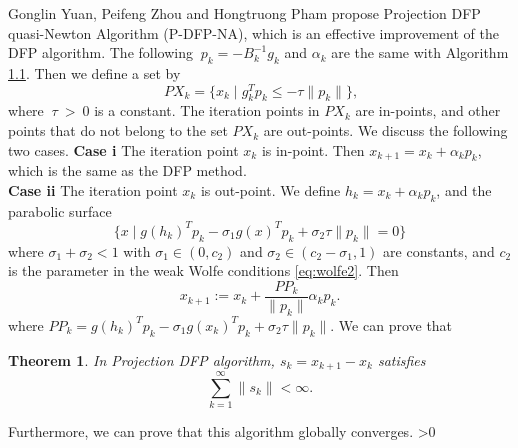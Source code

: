 \documentclass[12pt,a4paper]{article}  %
\newcounter{cite}
\newtheorem{theorem}{Theorem}[section]
\theoremstyle{definition}
\numberwithin{equation}{section}
\begin{document}
Gonglin Yuan, Peifeng Zhou and Hongtruong Pham\cite{yuan2026projection} propose Projection DFP quasi-Newton Algorithm (P-DFP-NA), which is an effective improvement of the DFP algorithm. The following $~p_k=-B_k^{-1}g_k$ and $\alpha_k$ are the same with Algorithm \hyperref[1.1]{1.1}. Then we define a set by \begin{equation}
	~PX_k = \{x_k \mid g_k^T p_k \leq -\tau \|p_k\|\},
\end{equation} where $~\tau ~> ~0$ is a constant. The iteration points in $PX_k$ are in-points, and other points that do not belong to the set $PX_k$ are out-points. We discuss the following two cases.
\textbf{Case i} The iteration point $x_k$ is in-point. Then $x_{k+1}=x_k+\alpha_k p_k$, which is the same as the DFP method.\\
\textbf{\normalsize Case ii} The iteration point $x_k$ is out-point. We define $h_k=x_k+\alpha_kp_k$, and the parabolic surface \begin{equation}
	\{x \mid g(h_k)^T p_k - \sigma_1 g(x)^T p_k + \sigma_2 \tau \|p_k\| = 0\}
\end{equation}
where \( \sigma_1 + \sigma_2 < 1 \) with \( \sigma_1 \in (0, c_2) \) and \( \sigma_2 \in (c_2 - \sigma_1, 1) \) are constants, and \(c_2\) is the parameter in the weak Wolfe conditions \eqref{eq:wolfe2}. Then \begin{equation}
	x_{k+1} := x_k + \frac{PP_k}{\|p_k\|} \alpha_k p_k.
\end{equation}
where \( PP_k = g(h_k)^T p_k - \sigma_1 g(x_k)^T p_k + \sigma_2 \tau \|p_k\| \). We can prove that \begin{theorem}
	In Projection DFP algorithm, $s_k=x_{k+1}-x_k$ satisfies
	\begin{equation}
		\sum_{k=1}^{\infty} \|s_k\| < \infty.
	\end{equation}
\end{theorem}
Furthermore, we can prove that this algorithm globally converges.
\ifnum\value{cite}>0
    \small
    
    
\fi
\end{document}
